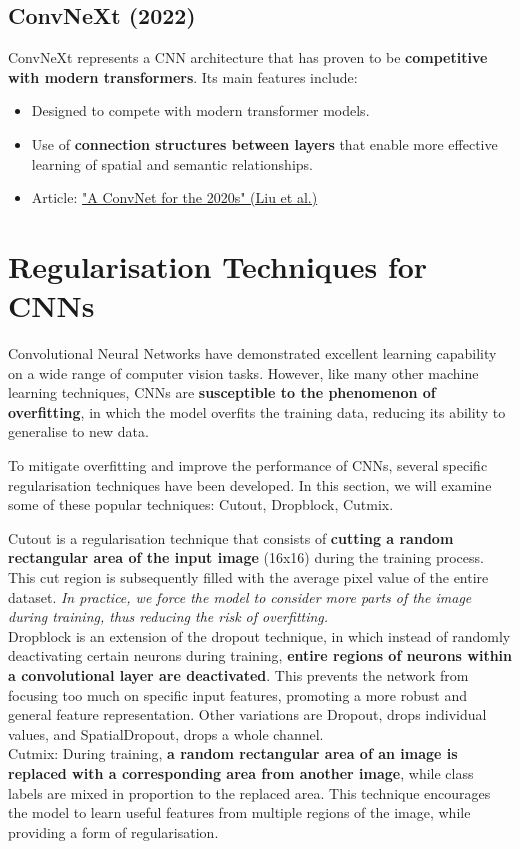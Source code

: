 \subsection{ConvNeXt (2022)}
ConvNeXt represents a CNN architecture that has proven to be \textbf{competitive with modern transformers}. Its main features include:
\begin{itemize}
    \item Designed to compete with modern transformer models.
    \item Use of \textbf{connection structures between layers} that enable more effective learning of spatial and semantic relationships.
    \item Article: \href{https://arxiv.org/pdf/2201.03545.pdf}{"A ConvNet for the 2020s" (Liu et al.)}
\end{itemize}


\section{Regularisation Techniques for CNNs}
Convolutional Neural Networks have demonstrated excellent learning capability on a wide range of computer vision tasks. However, like many other machine learning techniques, CNNs are \textbf{susceptible to the phenomenon of overfitting}, in which the model overfits the training data, reducing its ability to generalise to new data.

To mitigate overfitting and improve the performance of CNNs, several specific regularisation techniques have been developed. In this section, we will examine some of these popular techniques: Cutout, Dropblock, Cutmix.

\begin{outline}
Cutout is a regularisation technique that consists of \textbf{cutting a random rectangular area of the input image} (16x16) during the training process. This cut region is subsequently filled with the average pixel value of the entire dataset. \textit{In practice, we force the model to consider more parts of the image during training, thus reducing the risk of overfitting.} \\

Dropblock is an extension of the dropout technique, in which instead of randomly deactivating certain neurons during training, \textbf{entire regions of neurons within a convolutional layer are deactivated}. This prevents the network from focusing too much on specific input features, promoting a more robust and general feature representation. Other variations are Dropout, drops individual values, and SpatialDropout, drops a whole channel.\\

Cutmix: During training, \textbf{a random rectangular area of an image is replaced with a corresponding area from another image}, while class labels are mixed in proportion to the replaced area. This technique encourages the model to learn useful features from multiple regions of the image, while providing a form of regularisation.
\end{outline}


